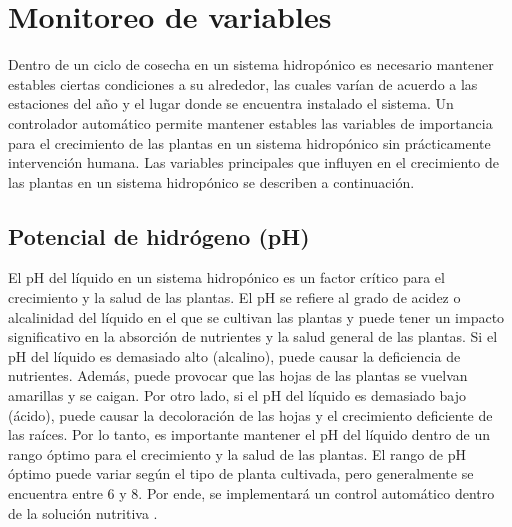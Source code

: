 \section{Monitoreo de variables}
Dentro de un ciclo de cosecha en un sistema hidropónico es necesario mantener estables ciertas condiciones a su alrededor, las cuales varían de acuerdo a las estaciones del año y el lugar donde se encuentra instalado el sistema. Un controlador automático permite mantener estables las variables de importancia para el crecimiento de las plantas en un sistema hidropónico sin prácticamente intervención humana. Las variables principales que influyen en el crecimiento de las plantas en un sistema hidropónico se describen a continuación.

\subsection{Potencial de hidrógeno (pH)}

El pH del líquido en un sistema hidropónico es un factor crítico para el crecimiento y la salud de las plantas. El pH se refiere al grado de acidez o alcalinidad del líquido en el que se cultivan las plantas y puede tener un impacto significativo en la absorción de nutrientes y la salud general de las plantas. Si el pH del líquido es demasiado alto (alcalino), puede causar la deficiencia de nutrientes. Además, puede provocar que las hojas de las plantas se vuelvan amarillas y se caigan. Por otro lado, si el pH del líquido es demasiado bajo (ácido), puede causar la decoloración de las hojas y el crecimiento deficiente de las raíces. Por lo tanto, es importante mantener el pH del líquido dentro de un rango óptimo para el crecimiento y la salud de las plantas. El rango de pH óptimo puede variar según el tipo de planta cultivada, pero generalmente se encuentra entre 6 y 8. Por ende, se implementará un control automático dentro de la solución nutritiva \cite{singh2016electrical}.

